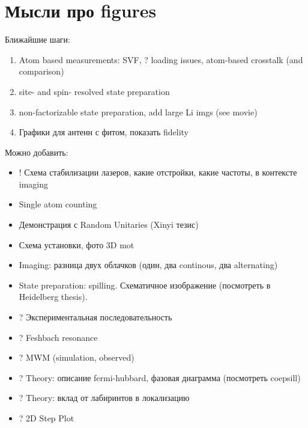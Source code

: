 
\section*{Мысли про figures}


Ближайшие шаги:
\begin{enumerate}
	
	\item Atom based measurements: SVF, ? loading issues, atom-based crosstalk (and comparison)
	
	\item site- and spin- resolved state preparation

	\item non-factorizable state preparation, add large Li imgs (see movie)

	\item Графики для антенн с фитом, показать fidelity

\end{enumerate}

Можно добавить:
\begin{itemize}
	\item ! Схема стабилизации лазеров, какие отстройки, какие частоты, в контексте imaging
	\item Single atom counting
	\item Демонстрация с Random Unitaries (Xinyi тезис)
	\item Схема установки, фото 3D mot
	\item Imaging: разница двух облачков (один, два continous, два alternating)
	\item State preparation: spilling. Схематичное изображение (посмотреть в Heidelberg thesis).
	\item ? Экспериментальная последовательность
	\item ? Feshbach resonance
	\item ? MWM (simulation, observed)
	\item ? Theory: описание fermi-hubbard, фазовая диаграмма (посмотреть coepsill)
	\item ? Theory: вклад от лабиринтов в локализацию
	\item ? 2D Step Plot
\end{itemize}